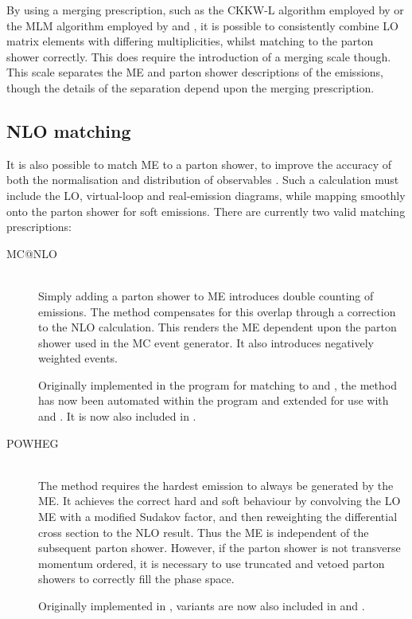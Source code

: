 By using a merging prescription, such as the CKKW-L algorithm \cite{CKKW,Lonnblad:2002} 
employed by \sherpa or the MLM algorithm \cite{Merging} employed by \alpgen \cite{Alpgen} 
and \madgraph \cite{MadGraph}, it is possible to consistently combine \ac{LO} matrix 
elements with differing multiplicities, whilst matching to the parton shower correctly. 
This does require the introduction of a merging scale though. This scale separates the 
\ac{ME} and parton shower descriptions of the emissions, though the details of the 
separation depend upon the merging prescription.



\subsection{NLO matching}
\label{sec:mc:matching}

It is also possible to match  \ac{ME} to a parton shower, to improve the accuracy
of both the normalisation and distribution of observables \cite{Nason:2012}. Such a 
calculation must include the \ac{LO}, virtual-loop and real-emission diagrams, while 
mapping smoothly onto the parton shower for soft emissions. There are currently two valid 
matching prescriptions:

\begin{description}
\item[MC@NLO] \hfill \\
	Simply adding a parton shower to  \ac{ME} introduces double counting of 
	emissions. The \mcatnlo method compensates for this overlap through a correction to 
	the \ac{NLO} calculation. This renders the \ac{ME} dependent upon the parton shower 
	used in the \ac{MC} event generator. It also introduces negatively weighted events.

	Originally implemented in the \mcatnlo program for matching to \fherwig 
	\cite{MCatNLO-Herwig} and \herwigpp \cite{MCatNLO-Herwig++}, the method has now been 
	automated within the \amcatnlo program \cite{aMCatNLO} and extended for use with 
	 and  \cite{MCatNLO-Pythia}. It is now also included in \sherpa.
\item[POWHEG] \hfill \\
	The \powhegmethod method requires the hardest emission to always be generated by 
	the \ac{ME}. It achieves the correct hard and soft behaviour by convolving the \ac{LO}
	\ac{ME} with a modified Sudakov factor, and then reweighting the differential cross 
	section to the \ac{NLO} result. Thus the \ac{ME} is independent of the subsequent 
	parton shower. However, if the parton shower is not transverse momentum ordered, it is
	necessary to use truncated and vetoed parton showers to correctly fill the phase 
	space.

	Originally implemented in \powhegbox \cite{Powheg-method,Powheg-method2,PowhegBox}, 
	variants are now also included in \herwigpp and \sherpa.
\end{description}



